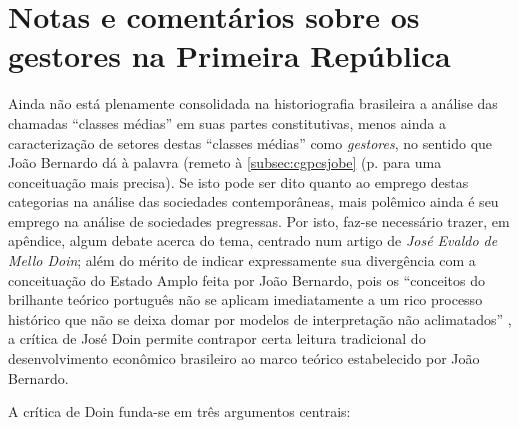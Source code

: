 \chapter{Notas e comentários sobre os gestores na Primeira República}\label{ap:1}

Ainda não está plenamente consolidada na historiografia brasileira a análise das chamadas ``classes médias'' em suas partes constitutivas, menos ainda a caracterização de setores destas ``classes médias'' como \textit{gestores}, no sentido que João Bernardo dá à palavra (remeto à \autoref{subsec:cgpcsjobe} (p. \pageref{subsec:cgpcsjobe} para uma conceituação mais precisa). Se isto pode ser dito quanto ao emprego destas categorias na análise das sociedades contemporâneas, mais polêmico ainda é seu emprego na análise de sociedades pregressas. Por isto, faz-se necessário trazer, em apêndice, algum debate acerca do tema, centrado num artigo de \textit{José Evaldo de Mello Doin}; além do mérito de indicar expressamente sua divergência com a conceituação do Estado Amplo feita por João Bernardo, pois os ``conceitos do brilhante teórico português não se aplicam imediatamente a um rico processo histórico que não se deixa domar por modelos de interpretação não aclimatados'' \cite[pp.~103-104]{doin_bernardo_1996}, a crítica de José Doin permite contrapor certa leitura tradicional do desenvolvimento econômico brasileiro ao marco teórico estabelecido por João Bernardo.

A crítica de Doin funda-se em três argumentos centrais:


